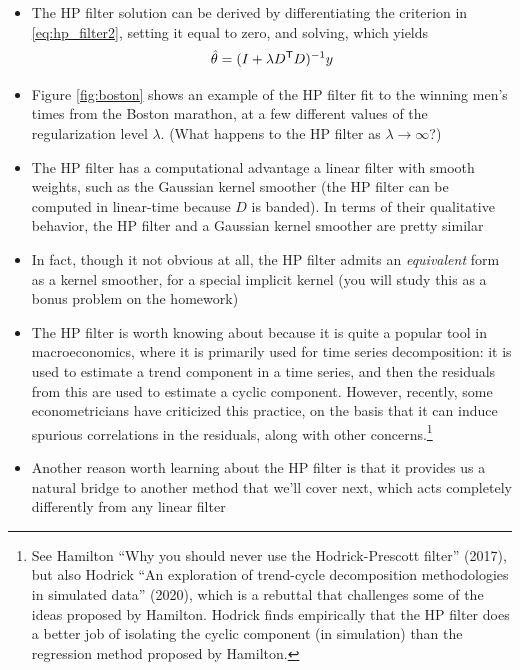 \documentclass{article}
\begin{document}
\begin{itemize}
\item The HP filter solution can be derived by differentiating the criterion in
  \eqref{eq:hp_filter2}, setting it equal to zero, and solving, which yields 
  \begin{equation}
  \label{eq:theta_hp}
  \hat{\theta} = (I + \lambda D^{\mathsf{T}} D)^{-1} y
  \end{equation}

\item Figure \ref{fig:boston} shows an example of the HP filter fit to the
  winning men's times from the Boston marathon, at a few different values of the 
  regularization level $\lambda$. (What happens to the HP filter as $\lambda \to
  \infty$?)     

\item The HP filter has a computational advantage a linear filter with smooth
  weights, such as the Gaussian kernel smoother (the HP filter can be computed
  in linear-time because $D$ is banded). In terms of their qualitative behavior, 
  the HP filter and a Gaussian kernel smoother are pretty similar     

\item In fact, though it not obvious at all, the HP filter admits an
  \emph{equivalent} form as a kernel smoother, for a special implicit kernel 
  (you will study this as a bonus problem on the homework) 

\item The HP filter is worth knowing about because it is quite a popular tool in
  macroeconomics, where it is primarily used for time series decomposition: it
  is used to estimate a trend component in a time series, and then the residuals
  from this are used to estimate a cyclic component. However, recently, some 
  econometricians have criticized this practice, on the basis that it can induce
  spurious correlations in the residuals, along with other
  concerns.\footnote{See Hamilton ``Why you should never use the  
    Hodrick-Prescott filter'' (2017), but also Hodrick ``An exploration of
    trend-cycle decomposition methodologies in simulated data'' (2020), which is
    a rebuttal that challenges some of the ideas proposed by Hamilton. Hodrick
    finds empirically that the HP filter does a better job of isolating the
    cyclic component (in simulation) than the regression method proposed by 
    Hamilton.}  

\item Another reason worth learning about the HP filter is that it provides us a
  natural bridge to another method that we'll cover next, which acts completely 
  differently from any linear filter
\end{itemize}
\end{document}
